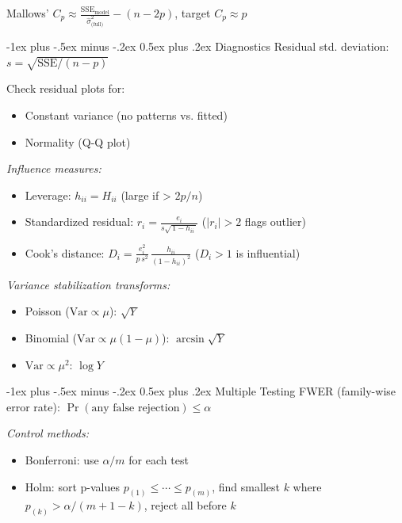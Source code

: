 \documentclass[6pt, landscape]{article}
\makeatletter
\renewcommand{\section}{\@startsection{section}{1}{0mm}%
                                {-1ex plus -.5ex minus -.2ex}%
                                {0.5ex plus .2ex}%
                                {\normalfont\bfseries}}
\makeatother
\begin{document}
\begin{multicols}{3}
        Mallows' $C_p \approx \frac{\mathrm{SSE}_{\text{model}}}{\hat{\sigma}^2_{\text{(full)}}} - (n - 2p)$, target $C_p \approx p$

        \section{Diagnostics}
        Residual std. deviation: $s = \sqrt{\mathrm{SSE}/(n-p)}$

        Check residual plots for:
        \begin{itemize}[leftmargin=*,topsep=0pt,itemsep=0pt]
                \item Constant variance (no patterns vs. fitted)
                \item Normality (Q-Q plot)
        \end{itemize}

        \textit{Influence measures:}
        \begin{itemize}[leftmargin=*,topsep=0pt,itemsep=0pt]
                \item Leverage: $h_{ii} = H_{ii}$ (large if > $2p/n$)
                \item Standardized residual: $r_i = \frac{e_i}{s\sqrt{\,1-h_{ii}\,}}$ ($|r_i|>2$ flags outlier)
                \item Cook's distance: $D_i = \frac{e_i^2}{p\,s^2}\,\frac{h_{ii}}{(1-h_{ii})^2}$ ($D_i>1$ is influential)
        \end{itemize}

        \textit{Variance stabilization transforms:}
        \begin{itemize}[leftmargin=*,topsep=0pt,itemsep=0pt]
                \item Poisson ($\mathrm{Var}\propto\mu$): $\sqrt{Y}$
                \item Binomial ($\mathrm{Var}\propto \mu(1-\mu)$): $\arcsin\sqrt{Y}$
                \item $\mathrm{Var}\propto \mu^2$: $\log Y$
        \end{itemize}

        \section{Multiple Testing}
        FWER (family-wise error rate): $\Pr(\text{any false rejection})\le \alpha$

        \textit{Control methods:}
        \begin{itemize}[leftmargin=*,topsep=0pt,itemsep=0pt]
                \item Bonferroni: use $\alpha/m$ for each test
                \item Holm: sort p-values $p_{(1)}\le \cdots \le p_{(m)}$, find smallest $k$ where $p_{(k)} > \alpha/(m+1-k)$, reject all before $k$
        \end{itemize}


\end{multicols}
\end{document}
